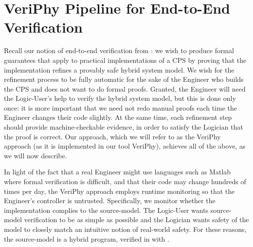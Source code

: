 \documentclass[12pt]{cmuthesis}
\theoremstyle{definition}
\theoremstyle{remark}
\newcommand{\rref}[2][]{\prettyref{#2}}
\newcommand{\VeriPhy}{VeriPhy\xspace}
\begin{document}
\section{\VeriPhy Pipeline for End-to-End Verification}
\label{sec:veriphy}
Recall our notion of end-to-end verification from \rref{ch:introduction}: we wish to produce formal guarantees that apply to practical implementations of a CPS by proving that the implementation refines a provably safe hybrid system model.
We wish for the refinement process to be fully automatic for the sake of the Engineer who builds the CPS and does not want to do formal proofs.
Granted, the Engineer will need the Logic-User's help to verify the hybrid system model, but this is done only once: it is more important that we need not redo manual proofs each time the Engineer changes their code slightly.
At the same time, each refinement step should provide machine-checkable evidence, in order to satisfy the Logician that the proof is correct.
Our approach, which we will refer to as the \VeriPhy approach (as it is implemented in our tool \VeriPhy), achieves all of the above, as we will now describe.

In light of the fact that a real Engineer might use languages such as Matlab where formal verification is difficult, and that their code may change hundreds of times per day, the \VeriPhy approach employs runtime monitoring so that the Engineer's controller is untrusted.
Specifically, we monitor whether the implementation complies to the source-model.
The Logic-User wants source-model verification to be as simple as possible and the Logician wants safety of the model to closely match an intuitive notion of real-world safety.
For these reasons, the source-model is a hybrid program, verified in \KeYmaeraX with \dL.
\end{document}
